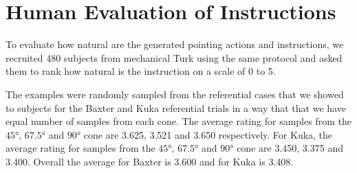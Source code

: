 \section{Human Evaluation of Instructions}

To evaluate how natural are the generated pointing actions and instructions, we recruited 480 subjects from mechanical Turk using the same protocol and asked them to rank how natural is the instruction on a scale of 0 to 5. 


The examples were randomly sampled from the referential cases that we showed to subjects for the Baxter and Kuka referential trials in a way that that we have equal number of samples from each cone. The average rating for samples from the $\ang{45}$, $\ang{67.5}$ and $\ang{90}$ cone are 3.625, 3.521
and 3.650 respectively. For Kuka, the average rating for samples from the $\ang{45}$, $\ang{67.5}$ and $\ang{90}$ cone are 3.450, 3.375 and 3.400. Overall the average for Baxter is 3.600 and for Kuka is 3.408.

